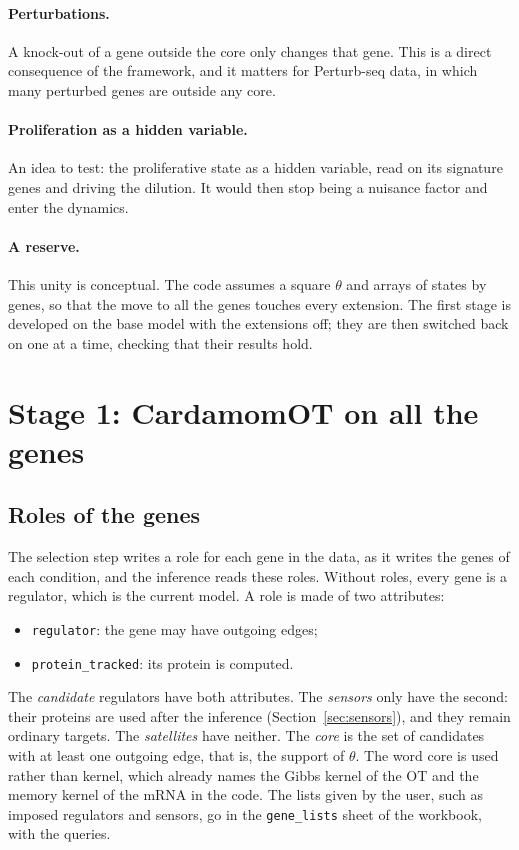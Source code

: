 \documentclass[a4paper, 11pt]{article}
\theoremstyle{plain}
\theoremstyle{remark}
\begin{document}
\paragraph{Perturbations.} A knock-out of a gene outside the core only changes that gene. This is a direct consequence of the framework, and it matters for Perturb-seq data, in which many perturbed genes are outside any core.

\paragraph{Proliferation as a hidden variable.} An idea to test: the proliferative state as a hidden variable, read on its signature genes and driving the dilution. It would then stop being a nuisance factor and enter the dynamics.

\paragraph{A reserve.} This unity is conceptual. The code assumes a square $\theta$ and arrays of states by genes, so that the move to all the genes touches every extension. The first stage is developed on the base model with the extensions off; they are then switched back on one at a time, checking that their results hold.

\section{Stage 1: CardamomOT on all the genes}\label{sec:stage1}

\subsection{Roles of the genes}\label{sec:roles}

The selection step writes a role for each gene in the data, as it writes the genes of each condition, and the inference reads these roles. Without roles, every gene is a regulator, which is the current model. A role is made of two attributes:
\begin{itemize}[nosep]
\item \texttt{regulator}: the gene may have outgoing edges;
\item \texttt{protein\_tracked}: its protein is computed.
\end{itemize}
The \emph{candidate} regulators have both attributes. The \emph{sensors} only have the second: their proteins are used after the inference (Section~\ref{sec:sensors}), and they remain ordinary targets. The \emph{satellites} have neither. The \emph{core} is the set of candidates with at least one outgoing edge, that is, the support of $\theta$. The word core is used rather than kernel, which already names the Gibbs kernel of the OT and the memory kernel of the mRNA in the code. The lists given by the user, such as imposed regulators and sensors, go in the \texttt{gene\_lists} sheet of the workbook, with the queries.
\end{document}
